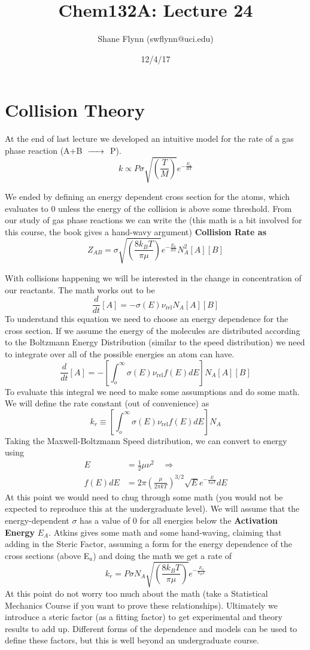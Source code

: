 \documentclass{article}
\title{Chem132A: Lecture 24}
\author{Shane Flynn (swflynn@uci.edu)}
\date{12/4/17}
\newcommand{\be}{\begin{equation}}
\newcommand{\ee}{\end{equation}}
\begin{document}
\maketitle

\section*{Collision Theory}
 At the end of last lecture we developed an intuitive model for the rate of a gas phase reaction (A+B $\ce{->}$ P). 
 \be
 k \propto P\sigma \sqrt{\left(\frac{T}{M}\right)}e^{-\frac{E_a}{RT}}
 \ee
 
 We ended by defining an energy dependent cross section for the atoms, which evaluates to 0 unless the energy of the collision is above some threshold. 
 From our study of gas phase reactions we can write the (this math is a bit involved for this course, the book gives a hand-wavy argument) \textbf{Collision Rate as}
 \be
 Z_{AB} = \sigma \sqrt{\left(\frac{8k_BT}{\pi\mu}\right)}e^{-\frac{E_a}{RT}}N^2_A[A][B]
 \ee
 
 With collisions happening we will be interested in the change in concentration of our reactants. 
 The math works out to be
 \be
 \frac{d}{dt}[A] = -\sigma(E) \nu_{\text{rel}} N_A[A][B]
 \ee
 To understand this equation we need to choose an energy dependence for the cross section. 
 If we assume the energy of the molecules are distributed according to the Boltzmann Energy Distribution (similar to the speed distribution) we need to integrate over  all of the possible energies an atom can have. 
 \be
 \frac{d}{dt}[A] = -\left[\int_o^\infty \sigma(E) \nu_{\text{rel}} f(E)dE \right] N_A[A][B]
 \ee
 To evaluate this integral we need to make some assumptions and do some math. 
 We will define the rate constant (out of convenience) as
 \be
 k_r \equiv \left[\int_o^\infty \sigma(E) \nu_{\text{rel}} f(E)dE \right] N_A
 \ee
 Taking the Maxwell-Boltzmann Speed distribution, we can convert to energy using
 \be
 \begin{split}
     E &= \frac{1}{2}\mu\nu^2 \quad \Rightarrow\\
     f(E)dE &= 2\pi \left(\frac{\mu}{2\pi kT}\right)^{3/2} \sqrt{E} e^{-\frac{E}{k_BT}}dE
 \end{split}
 \ee
 At this point we would need to chug through some math (you would not be expected to reproduce this at the undergraduate level). 
 We will assume that the energy-dependent $\sigma$ has a value of 0 for all energies below the \textbf{Activation Energy} $E_A$. 
 Atkins gives some math and some hand-waving, claiming that adding in the Steric Factor, assuming a form for the energy dependence of the cross sections (above E$_a$) and doing the math we get a rate of 
 \be
 k_r = P\sigma N_A \sqrt{\left(\frac{8k_BT}{\pi \mu}\right)}e^{-\frac{E_a}{k_BT}}
 \ee
 At this point do not worry too much about the math (take a Statistical Mechanics Course if you want to prove these relationships). 
 Ultimately we introduce a steric factor (as a fitting factor) to get experimental and theory results to add up. 
 Different forms of the dependence and models can be used to define these factors, but this is well beyond an undergraduate course. 
 
\end{document}
